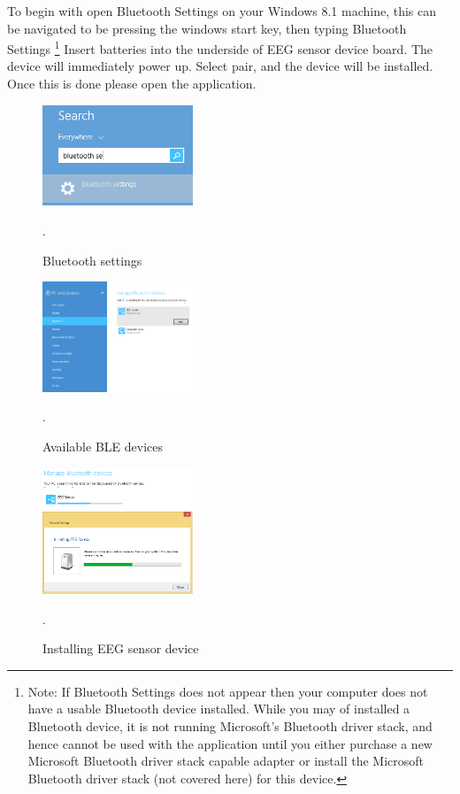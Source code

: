 \documentclass[]{article}
\begin{document}
To begin with open Bluetooth Settings on your Windows 8.1 machine, this can be navigated to be pressing the windows start key, then typing Bluetooth Settings \footnote{Note: If Bluetooth Settings does not appear then your computer does not have a usable Bluetooth device installed. While you may of installed a Bluetooth device, it is not running Microsoft's Bluetooth driver stack, and hence cannot be used with the application until you either purchase a new Microsoft Bluetooth driver stack capable adapter or install the Microsoft Bluetooth driver stack (not covered here) for this device.} Insert batteries into the underside of EEG sensor device board. The device will immediately power up. Select pair, and the device will be installed. Once this is done please open the application. 

\begin{figure}[H]
	\begin{center}
		\includegraphics[width = 0.4\textwidth]{search}
	\end{center}
	\caption{Bluetooth settings}. 
	\label{fig:search}
\end{figure}

\begin{figure}[H]
	\begin{center}
		\includegraphics[width = 0.4\textwidth]{searching}
	\end{center}
	\caption{Available \ac{BLE} devices}. 
	\label{fig:searchinguguide}
\end{figure}

\begin{figure}[H]
	\begin{center}
		\includegraphics[width = 0.4\textwidth]{connecting}
	\end{center}
	\caption{Installing EEG sensor device}. 
	\label{fig:connectinguguide}
\end{figure}
\end{document}
